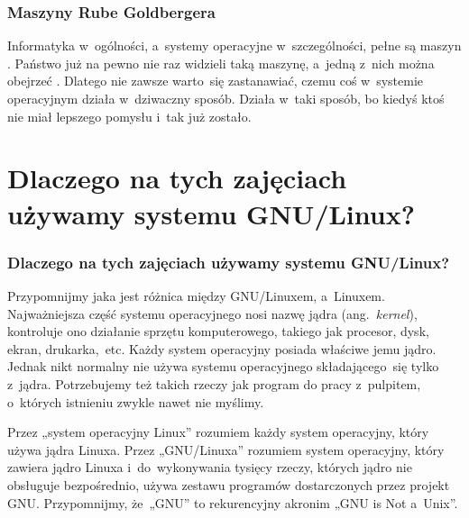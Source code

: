 \documentclass[10pt,t]{beamer}
\begin{document}
\begin{frame}
  \frametitle{Maszyny Rube Goldbergera}


  Informatyka w~ogólności, a~systemy operacyjne w~szczególności, pełne są
  maszyn
  . Państwo już na pewno nie raz
  widzieli taką maszynę, a~jedną z~nich można obejrzeć
  .
  Dlatego nie zawsze warto~się zastanawiać, czemu coś w~systemie operacyjnym
  działa w~dziwaczny sposób. Działa w~taki sposób, bo kiedyś ktoś nie miał
  lepszego pomysłu i~tak już zostało.

\end{frame}










\section{Dlaczego na tych zajęciach używamy systemu
  GNU/Linux?}


\begin{frame}
  \frametitle{Dlaczego na tych zajęciach używamy systemu
    GNU/Linux?}


  Przypomnijmy jaka jest różnica między GNU/Linuxem, a~Linuxem.
  Najważniejsza część systemu operacyjnego nosi nazwę jądra
  (ang.~\textit{kernel}), kontroluje ono działanie sprzętu komputerowego,
  takiego jak procesor, dysk, ekran, drukarka,~etc. Każdy system
  operacyjny posiada właściwe jemu jądro. Jednak nikt
  normalny nie używa systemu operacyjnego składającego~się tylko z~jądra.
  Potrzebujemy też takich rzeczy jak program do pracy z~pulpitem, o~których
  istnieniu zwykle nawet nie myślimy.

  Przez „system operacyjny Linux” rozumiem każdy system operacyjny,
  który używa jądra Linuxa. Przez „GNU/Linuxa” rozumiem system operacyjny,
  który zawiera jądro Linuxa i~do~wykonywania tysięcy rzeczy, których jądro
  nie obsługuje bezpośrednio, używa zestawu programów dostarczonych przez
  projekt GNU. Przypomnijmy, że~„GNU” to rekurencyjny akronim „GNU is Not
  a~Unix”.

\end{frame}
\end{document}
